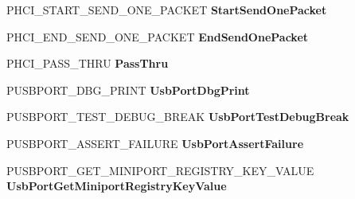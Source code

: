 \begin{DoxyCompactItemize}
\item 
\mbox{\label{struct___u_s_b_p_o_r_t___r_e_g_i_s_t_r_a_t_i_o_n___p_a_c_k_e_t_ab4a8d304a774d9c853e22f60a8c27e3e}} 
P\+H\+C\+I\+\_\+\+S\+T\+A\+R\+T\+\_\+\+S\+E\+N\+D\+\_\+\+O\+N\+E\+\_\+\+P\+A\+C\+K\+ET {\bfseries Start\+Send\+One\+Packet}
\item 
\mbox{\label{struct___u_s_b_p_o_r_t___r_e_g_i_s_t_r_a_t_i_o_n___p_a_c_k_e_t_acb512ae6492c4d1ab1b0f7c238317455}} 
P\+H\+C\+I\+\_\+\+E\+N\+D\+\_\+\+S\+E\+N\+D\+\_\+\+O\+N\+E\+\_\+\+P\+A\+C\+K\+ET {\bfseries End\+Send\+One\+Packet}
\item 
\mbox{\label{struct___u_s_b_p_o_r_t___r_e_g_i_s_t_r_a_t_i_o_n___p_a_c_k_e_t_a5f29a8b60779166309d25fae4b5fc752}} 
P\+H\+C\+I\+\_\+\+P\+A\+S\+S\+\_\+\+T\+H\+RU {\bfseries Pass\+Thru}
\item 
\mbox{\label{struct___u_s_b_p_o_r_t___r_e_g_i_s_t_r_a_t_i_o_n___p_a_c_k_e_t_ab52a823620be972e5e0c7be2706e8ab0}} 
P\+U\+S\+B\+P\+O\+R\+T\+\_\+\+D\+B\+G\+\_\+\+P\+R\+I\+NT {\bfseries Usb\+Port\+Dbg\+Print}
\item 
\mbox{\label{struct___u_s_b_p_o_r_t___r_e_g_i_s_t_r_a_t_i_o_n___p_a_c_k_e_t_a60a6b3e04b9753b2a11b7ef158abb83c}} 
P\+U\+S\+B\+P\+O\+R\+T\+\_\+\+T\+E\+S\+T\+\_\+\+D\+E\+B\+U\+G\+\_\+\+B\+R\+E\+AK {\bfseries Usb\+Port\+Test\+Debug\+Break}
\item 
\mbox{\label{struct___u_s_b_p_o_r_t___r_e_g_i_s_t_r_a_t_i_o_n___p_a_c_k_e_t_adc43f07ff68d4ee44b4a435479ab1719}} 
P\+U\+S\+B\+P\+O\+R\+T\+\_\+\+A\+S\+S\+E\+R\+T\+\_\+\+F\+A\+I\+L\+U\+RE {\bfseries Usb\+Port\+Assert\+Failure}
\item 
\mbox{\label{struct___u_s_b_p_o_r_t___r_e_g_i_s_t_r_a_t_i_o_n___p_a_c_k_e_t_a1aeddbed80627fc04eba2ee33917a78a}} 
P\+U\+S\+B\+P\+O\+R\+T\+\_\+\+G\+E\+T\+\_\+\+M\+I\+N\+I\+P\+O\+R\+T\+\_\+\+R\+E\+G\+I\+S\+T\+R\+Y\+\_\+\+K\+E\+Y\+\_\+\+V\+A\+L\+UE {\bfseries Usb\+Port\+Get\+Miniport\+Registry\+Key\+Value}

\end{DoxyCompactItemize}
